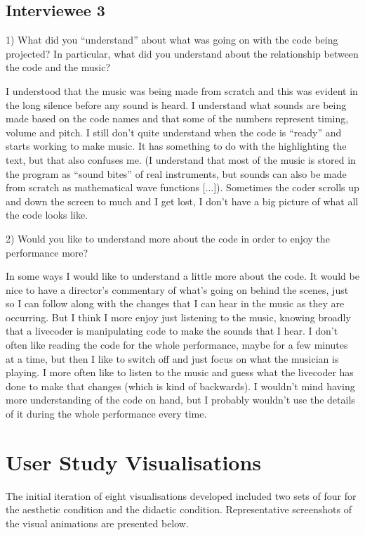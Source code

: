 \section*{Interviewee 3}

1) What did you ``understand'' about what was going on with the code being projected? In particular, what did you understand about the relationship between the code and the music?

I understood that the music was being made from scratch and this was evident in the long silence before any sound is heard. I understand what sounds are being made based on the code names and that some of the numbers represent timing, volume and pitch.  I still don't quite understand when the code is ``ready'' and starts working to make music. It has something to do with the highlighting the text, but that also confuses me. (I understand that most of the music is stored in the program as ``sound bites'' of real instruments, but sounds can also be made from scratch as mathematical wave functions [...]). Sometimes the coder scrolls up and down the screen to much and I get lost, I don't have a big picture of what all the code looks like.

2) Would you like to understand more about the code in order to enjoy the performance more?

In some ways I would like to understand a little more about the code. It would be nice to have a director's commentary of what's going on behind the scenes, just so I can follow along with the changes that I can hear in the music as they are occurring. But I think I more enjoy just listening to the music, knowing broadly that a livecoder is manipulating code to make the sounds that I hear. I don't often like reading the code for the whole performance, maybe for a few minutes at a time, but then I like to switch off and just focus on what the musician is playing. I more often like to listen to the music and guess what the livecoder has done to make that changes (which is kind of backwards). I wouldn't mind having more understanding of the code on hand, but I probably wouldn't use the details of it during the whole performance every time.


\chapter{User Study Visualisations}

The initial iteration of eight visualisations developed included two sets of four for the aesthetic condition and the didactic condition. Representative screenshots of the visual animations are presented below.

